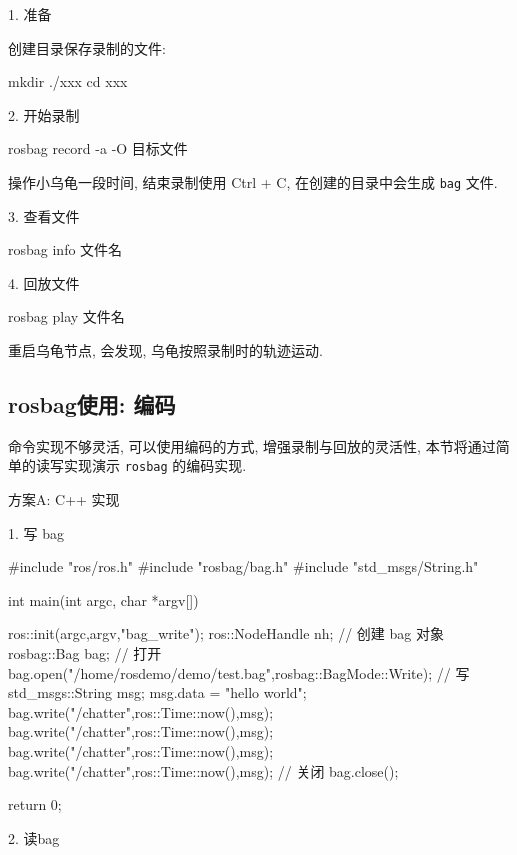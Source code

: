 \documentclass[openany, fontset=windowsold]{ctexbook}
\theoremstyle{kaiti}
\theoremstyle{normal}
\begin{document}
1. 准备

创建目录保存录制的文件:

\begin{bash}
  mkdir ./xxx
  cd xxx
\end{bash}

2. 开始录制

\begin{bash}
  rosbag record -a -O 目标文件
\end{bash}

操作小乌龟一段时间, 结束录制使用 Ctrl + C, 在创建的目录中会生成 \verb|bag| 文件.

3. 查看文件

\begin{bash}
  rosbag info 文件名
\end{bash}

4. 回放文件

\begin{bash}
  rosbag play 文件名
\end{bash}

重启乌龟节点, 会发现, 乌龟按照录制时的轨迹运动.

\subsection{rosbag使用: 编码}

命令实现不够灵活, 可以使用编码的方式, 增强录制与回放的灵活性, 本节将通过简单的读写实现演示 \verb|rosbag| 的编码实现.

方案A: C++ 实现

1. 写 bag

\begin{cpp}
  #include "ros/ros.h"
  #include "rosbag/bag.h"
  #include "std_msgs/String.h"

  int main(int argc, char *argv[])
  {
      ros::init(argc,argv,"bag_write");
      ros::NodeHandle nh;
      // 创建 bag 对象
      rosbag::Bag bag;
      // 打开
      bag.open("/home/rosdemo/demo/test.bag",rosbag::BagMode::Write);
      // 写
      std_msgs::String msg;
      msg.data = "hello world";
      bag.write("/chatter",ros::Time::now(),msg);
      bag.write("/chatter",ros::Time::now(),msg);
      bag.write("/chatter",ros::Time::now(),msg);
      bag.write("/chatter",ros::Time::now(),msg);
      // 关闭
      bag.close();

      return 0;
  }
\end{cpp}

2. 读bag
\end{document}
